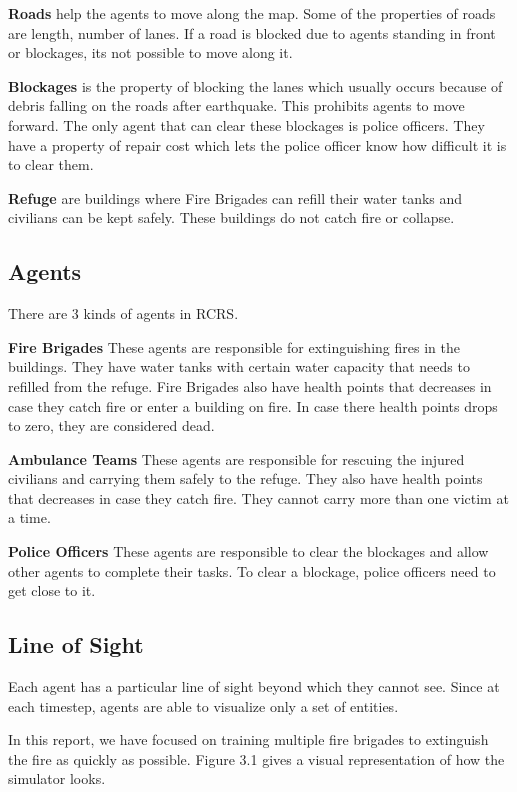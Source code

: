 \documentclass[12pt]{report}
\begin{document}
\textbf{Roads} help the agents to move along the map. Some of the properties of roads are length, number of lanes. If a road is blocked due to agents standing in front or blockages, its not possible to move along it. 

\textbf{Blockages} is the property of blocking the lanes which usually occurs because of debris falling on the roads after earthquake. This prohibits agents to move forward. The only agent that can clear these blockages is police officers. They have a property of repair cost which lets the police officer know how difficult it is to clear them. 

\textbf{Refuge} are buildings where Fire Brigades can refill their water tanks and civilians can be kept safely. These buildings do not catch fire or collapse. 

\subsection{Agents} There are 3 kinds of agents in RCRS. 

\textbf{Fire Brigades} These agents are responsible for extinguishing fires in the buildings. They have water tanks with certain water capacity that needs to refilled from the refuge. Fire Brigades also have health points that decreases in case they catch fire or enter a building on fire. In case there health points drops to zero, they are considered dead. 

\textbf{Ambulance Teams} These agents are responsible for rescuing the injured civilians and carrying them safely to the refuge. They also have health points that decreases in case they catch fire. They cannot carry more than one victim at a time. 

\textbf{Police Officers} These agents are responsible to clear the blockages and allow other agents to complete their tasks. To clear a blockage, police officers need to get close to it. 

\subsection{Line of Sight} Each agent has a particular line of sight beyond which they cannot see. Since at each timestep, agents are able to visualize only a set of entities.

\hfill

In this report, we have focused on training multiple fire brigades to extinguish the fire as quickly as possible. Figure 3.1 gives a visual representation of how the simulator looks. 
\end{document}
